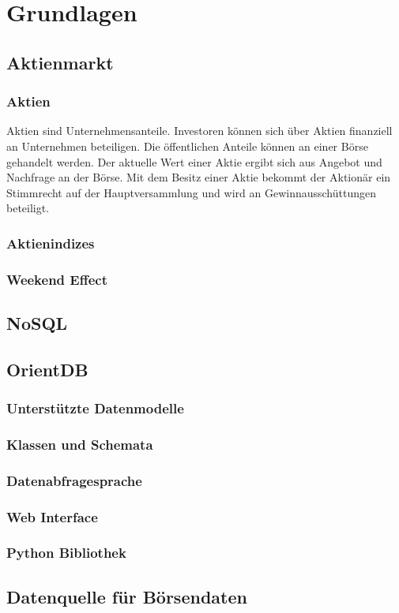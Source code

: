 \section{Grundlagen}

\subsection{Aktienmarkt}

\subsubsection{Aktien}

Aktien sind Unternehmensanteile. Investoren können sich über Aktien finanziell an Unternehmen beteiligen. Die öffentlichen Anteile können an einer Börse gehandelt werden. Der aktuelle Wert einer Aktie ergibt sich aus Angebot und Nachfrage an der Börse. Mit dem Besitz einer Aktie bekommt der Aktionär ein Stimmrecht auf der Hauptversammlung und wird an Gewinnausschüttungen beteiligt.

\subsubsection{Aktienindizes}

\subsubsection{Weekend Effect}

\subsection{NoSQL}

\subsection{OrientDB}

\subsubsection{Unterstützte Datenmodelle}

\subsubsection{Klassen und Schemata}

\subsubsection{Datenabfragesprache}

\subsubsection{Web Interface}

\subsubsection{Python Bibliothek}

\subsection{Datenquelle für Börsendaten}

\clearpage